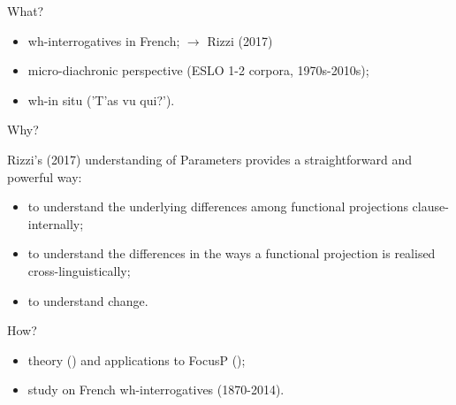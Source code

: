 \documentclass[lesson_slides]{subfiles}
\begin{document}
\begin{frame}[c]{What?}

    \begin{itemize}
        \item[\ding{227}] wh-interrogatives in French; \pause $\longrightarrow$ Rizzi (2017) \pause
        \item[\ding{227}] micro-diachronic perspective \pause (ESLO 1-2 corpora, 1970s-2010s);\\ \pause
        \item[\ding{227}] wh-in situ \pause ('T'as vu qui?').
    \end{itemize}
    
\end{frame}
\begin{frame}[c]{Why?}

    Rizzi's (2017) understanding of Parameters provides a straightforward and powerful way: \pause
    \begin{itemize}
        \item[\ding{227}] to understand the underlying differences among functional projections clause-internally; \pause 
        \item[\ding{227}] to understand the differences in the ways a functional projection is realised cross-linguistically;
        \item[\ding{227}] to understand change.
    \end{itemize}
  
\end{frame}
\begin{frame}[c]{How?}

    \begin{itemize}
        \item[\ding{227}] theory (\cite{rizzi1997fine}) and applications to FocusP (\cite{samo2019cartography}); \pause 
        \item[\ding{227}] study on French wh-interrogatives \pause (1870-2014).
    \end{itemize}
\end{frame}
\end{document}
